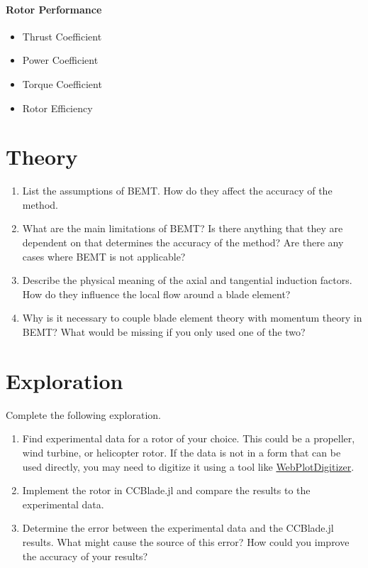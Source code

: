 \documentclass[11pt,twocolumn]{article}
\begin{document}
\paragraph{Rotor Performance}
\begin{itemize}
	\item Thrust Coefficient
	\item Power Coefficient
	\item Torque Coefficient
	\item Rotor Efficiency
\end{itemize}



\newpage
\section{Theory}
\label{sec:theory}

\begin{enumerate}[label=\roman*.]
	\item List the assumptions of BEMT. How do they affect the accuracy of the method.
	\item What are the main limitations of BEMT? Is there anything that they are dependent on that determines the accuracy of the method? Are there any cases where BEMT is not applicable?
	\item Describe the physical meaning of the axial and tangential induction factors. How do they influence the local flow around a blade element? 
	\item Why is it necessary to couple blade element theory with momentum theory in BEMT? What would be missing if you only used one of the two?
\end{enumerate}


\section{Exploration}
\label{sec:exploration}

Complete the following exploration.
\begin{enumerate}[label=\roman*.]
	\item Find experimental data for a rotor of your choice. This could be a propeller, wind turbine, or helicopter rotor. If the data is not in a form that can be used directly, you may need to digitize it using a tool like \href{https://automeris.io/WebPlotDigitizer/}{WebPlotDigitizer}.
	\item Implement the rotor in CCBlade.jl and compare the results to the experimental data. 
	\item Determine the error between the experimental data and the CCBlade.jl results. What might cause the source of this error? How could you improve the accuracy of your results?
\end{enumerate}
\end{document}
